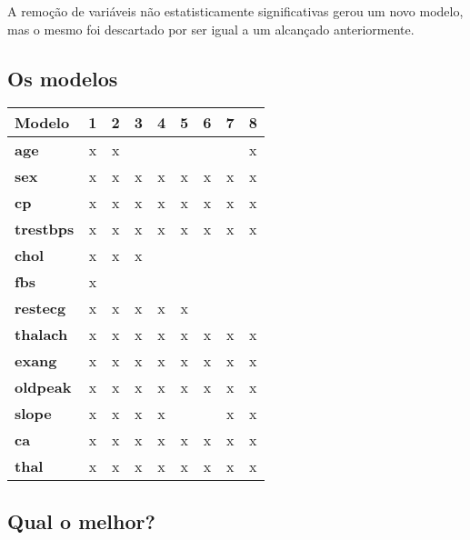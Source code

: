 \documentclass[a4paper]{report}
\begin{document}
{	A remoção de variáveis não estatisticamente significativas gerou um novo modelo, mas o mesmo foi descartado por ser igual a um alcançado anteriormente.


	\subsection{Os modelos}

	\begin{center}
		\begin{tabular}{ || l || c | c | c | c | c | c | c | c || }
		\hline
		\textbf{Modelo} & \textbf{1} & \textbf{2} & \textbf{3} & \textbf{4} & \textbf{5} & \textbf{6} & \textbf{7} & \textbf{8} \\
		\hline
		\hline
		\textbf{age} 		& x & x &   &	&	&	&	& x	\\
		\hline
		\textbf{sex} 		& x & x & x & x	& x	& x	& x	& x	\\
		\hline
		\textbf{cp} 		& x & x & x	& x	& x	& x	& x	& x	\\
		\hline
		\textbf{trestbps} 	& x & x & x & x	& x	& x	& x	& x	\\
		\hline
		\textbf{chol} 		& x & x & x &	&	&	&	& 	\\
		\hline
		\textbf{fbs} 		& x &   &   &	&	&	&	& 	\\
		\hline
		\textbf{restecg} 	& x & x & x & x	& x	&	& 	&	\\
		\hline
		\textbf{thalach} 	& x & x & x & x	& x	& x	& x	& x	\\
		\hline
		\textbf{exang} 		& x & x & x & x & x	& x	& x	& x	\\
		\hline
		\textbf{oldpeak} 	& x & x & x & x & x	& x	& x	& x	\\
		\hline
		\textbf{slope} 		& x & x & x & x	&	&	& x	& x	\\
		\hline
		\textbf{ca} 		& x & x & x & x	& x	& x & x	& x	\\
		\hline
		\textbf{thal} 		& x & x & x & x	& x	& x	& x	& x	\\
		\hline
		\end{tabular}
	\end{center}


	\subsection{Qual o melhor?}

}
\end{document}
